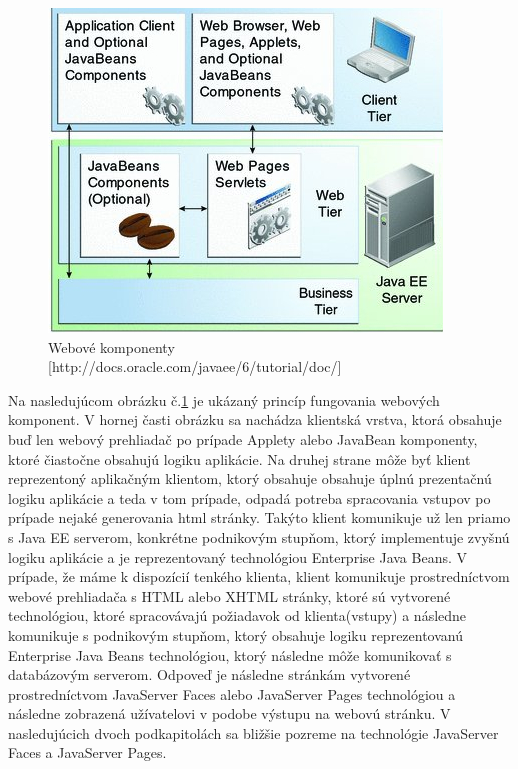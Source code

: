 \begin{figure}[htb]

\begin{center}

\includegraphics[scale=0.5]{webtechnology.jpg} 
\caption{Webové komponenty [http://docs.oracle.com/javaee/6/tutorial/doc/] }
\label{web}

\end{center}

\end{figure}
Na nasledujúcom obrázku č.\ref{web} je ukázaný princíp fungovania webových komponent. V hornej časti obrázku sa nachádza klientská vrstva, ktorá obsahuje buď len webový prehliadač po prípade Applety alebo JavaBean komponenty, ktoré čiastočne obsahujú logiku aplikácie. Na druhej strane môže byť klient reprezentoný aplikačným klientom, ktorý obsahuje obsahuje úplnú prezentačnú logiku aplikácie a teda v tom prípade, odpadá potreba spracovania vstupov po prípade nejaké generovania html stránky. Takýto klient komunikuje už len priamo s Java EE serverom, konkrétne podnikovým stupňom, ktorý implementuje zvyšnú logiku aplikácie a je reprezentovaný technológiou Enterprise Java Beans. V prípade, že máme k dispozícií tenkého klienta, klient komunikuje prostredníctvom webové prehliadača s HTML alebo XHTML stránky, ktoré sú vytvorené technológiou, ktoré spracovávajú požiadavok od klienta(vstupy) a následne komunikuje s podnikovým stupňom, ktorý obsahuje logiku reprezentovanú Enterprise Java Beans technológiou, ktorý následne môže komunikovať s databázovým serverom. Odpoveď je následne  stránkám vytvorené prostredníctvom JavaServer Faces alebo JavaServer Pages technológiou a následne zobrazená užívatelovi v podobe výstupu na webovú stránku. V nasledujúcich dvoch podkapitolách sa bližšie pozreme na technológie JavaServer Faces a JavaServer Pages.


